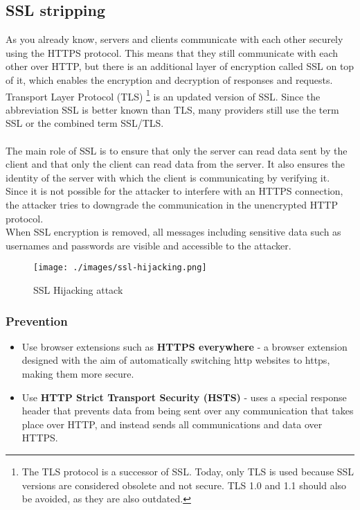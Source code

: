 \newpage
\subsection{SSL stripping}
As you already know, servers and clients communicate with each other securely using the HTTPS protocol.
This means that they still communicate with each other over HTTP, but there is an additional layer of encryption called SSL on top of it, which enables the encryption and decryption of responses and requests.\\ Transport Layer Protocol (TLS) \footnote{The TLS protocol is a successor of SSL. Today, only TLS is used because SSL versions are considered obsolete and not secure. TLS 1.0 and 1.1 should also be avoided, as they are also outdated.} is an updated version of SSL. Since the abbreviation SSL is better known than TLS, many providers still use the term SSL or the combined term SSL/TLS. \\
\\The main role of SSL is to ensure that only the server can read data sent by the client and that only the client can read data from the server. It also ensures the identity of the server with which the client is communicating by verifying it. \\
Since it is not possible for the attacker to interfere with an HTTPS connection, the attacker tries to downgrade the communication in the unencrypted HTTP protocol. \\
When SSL encryption is removed, all messages including sensitive data such as usernames and passwords are visible and accessible to the attacker. \\

\begin{figure}[H]
    \centering
    \texttt{[image: ./images/ssl-hijacking.png]}
    \caption{SSL Hijacking attack} 
\end{figure}

\subsubsection{Prevention}
\begin{itemize}
    \item Use browser extensions such as \textbf{HTTPS everywhere} - a browser extension designed with the aim of automatically switching http websites to https, making them more secure.
    \item Use \textbf{HTTP Strict Transport Security (HSTS)} - uses a special response header that prevents data from being sent over any communication that takes place over HTTP, and instead sends all communications and data over HTTPS.
\end{itemize}

